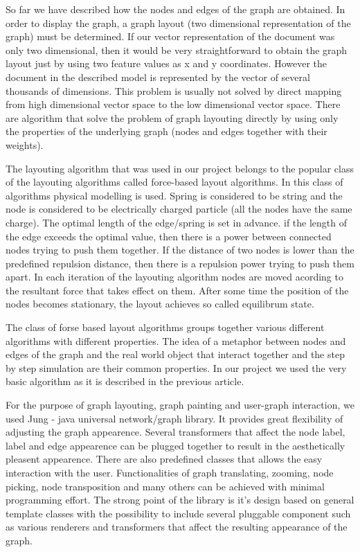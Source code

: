 
So far we have described how the nodes and edges of the graph are obtained. In order to display the graph, a graph layout (two dimensional representation of the graph) must be determined. If our vector representation of the document was only two dimensional, then it would be very straightforward to obtain the graph layout just by using two feature values as x and y coordinates. However the document in the described model is represented by the vector of several thousands of dimensions. This problem is usually not solved by direct mapping from high dimensional vector space to the low dimensional vector space. There are algorithm that solve the problem of graph layouting directly by using only the properties of the underlying graph (nodes and edges together with their weights).

The layouting algorithm that was used in our project belongs to the popular class of the layouting algorithms called force-based layout algorithms. In this class of algorithms physical modelling is used. Spring is considered to be string and the node is considered to be electrically charged particle (all the nodes have the same charge). The optimal length of the edge/spring is set in advance. if the length of the edge exceeds the optimal value, then there is a power between connected nodes trying to push them together. If the distance of two nodes is lower than the predefined repulsion distance, then there is a repulsion power trying to push them apart. In each iteration of the layouting algorithm nodes are moved acording to the resultant force that takes effect on them. After some time the position of the nodes becomes stationary, the layout achieves so called equilibrum state.

The class of forse based layout algorithms groups together various different algorithms with different properties. The idea of a metaphor between nodes and edges of the graph and the real world object that interact together and the step by step simulation are their common properties. In our project we used the very basic algorithm as it is described in the previous article.

For the purpose of graph layouting, graph painting and user-graph interaction, we used Jung - java universal network/graph library. It provides great flexibility of adjusting the graph appearence. Several transformers that affect the node label, label and edge appearence can be plugged together to result in the aesthetically pleasent appearence. There are also predefined classes that allows the easy interaction with the user. Functionalities of graph translating, zooming, node picking, node transposition and many others can be achieved with minimal programming effort. The strong point of the library is it's design based on general template classes with the possibility to include several pluggable component such as various renderers and transformers that affect the resulting appearance of the graph. 

